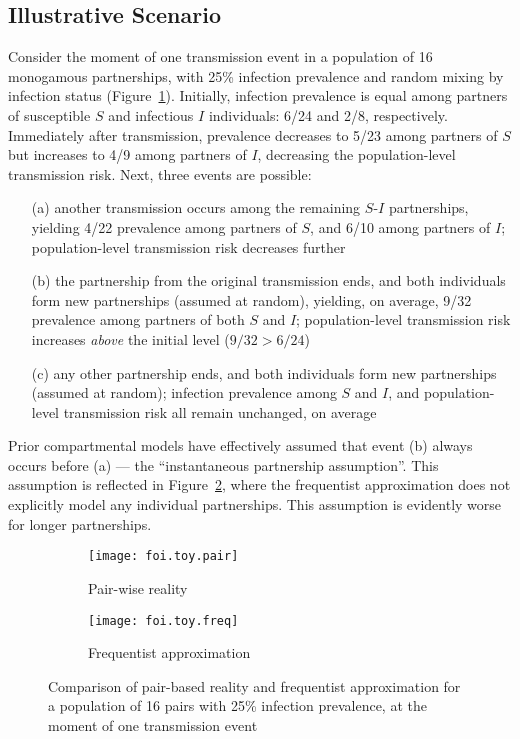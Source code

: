 \subsection{Illustrative Scenario}\label{sr.foi.toy}
Consider the moment of one transmission event
in a population of 16 monogamous partnerships, with 25\% infection prevalence
and random mixing by infection status (Figure~\ref{fig:foi.toy.pair}).
Initially, infection prevalence is equal among partners of
susceptible $S$ and infectious $I$ individuals: 6/24 and 2/8, respectively.
Immediately after transmission,
prevalence decreases to 5/23 among partners of $S$ but increases to 4/9 among partners of $I$,
decreasing the population-level transmission risk.
Next, three events are possible:
\begin{enumerate}
  \item[(a)] \label{toy.e.t}
  another transmission occurs among the remaining $S$-$I$ partnerships,
  yielding 4/22 prevalence among partners of $S$, and 6/10 among partners of $I$;
  population-level transmission risk decreases further
  \item[(b)] \label{toy.e.p}
  the partnership from the original transmission ends,
  and both individuals form new partnerships (assumed at random),
  yielding, on average, 9/32 prevalence among partners of both $S$ and $I$;
  population-level transmission risk increases \emph{above} the initial level ($9/32 > 6/24$)
  \item[(c)] \label{toy.e.q}
  any other partnership ends,
  and both individuals form new partnerships (assumed at random);
  infection prevalence among $S$ and $I$, and population-level transmission risk
  all remain unchanged, on average
\end{enumerate}
Prior compartmental models have effectively assumed that
event (b) always occurs before (a)
--- \ie the ``instantaneous partnership assumption''.
This assumption is reflected in Figure~\ref{fig:foi.toy.freq},
where the frequentist approximation does not explicitly model any individual partnerships.
This assumption is evidently worse for longer partnerships.
\begin{figure}
  \begin{subfigure}{.5\linewidth}
    \centering\texttt{[image: foi.toy.pair]}
    \caption{Pair-wise reality}
    \label{fig:foi.toy.pair}
  \end{subfigure}%
  \begin{subfigure}{.5\linewidth}
    \centering\texttt{[image: foi.toy.freq]}
    \caption{Frequentist approximation}
    \label{fig:foi.toy.freq}
  \end{subfigure}
  \caption{Comparison of pair-based reality and frequentist approximation
    for a population of 16 pairs with 25\% infection prevalence,
    at the moment of one transmission event}
  \label{fig:foi.toy}
\end{figure}
